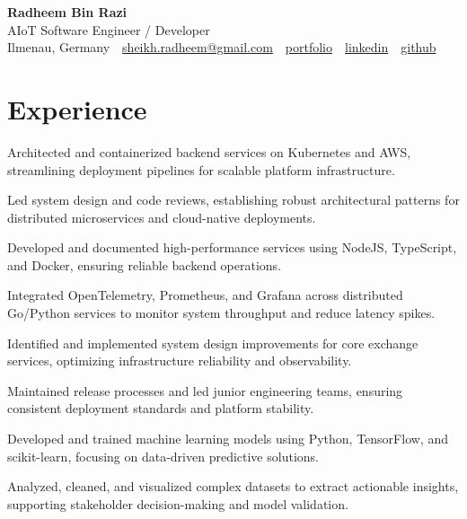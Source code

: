 \documentclass[10pt,a4paper]{resume}
\makeatletter
\newcommand{\Portfolio}{https://radheem.github.io/my-cv}
\newcommand{\PortfolioText}{portfolio}
\newcommand{\GitHub}{https://github.com/radheem}
\newcommand{\LinkedIn}{https://www.linkedin.com/in/radheem-razi}
\newcommand{\Email}{sheikh.radheem@gmail.com}
\makeatother
\begin{document}
\begin{center}
  {\huge\bfseries Radheem Bin Razi}\\[3pt]
  {\large AIoT Software Engineer / Developer}\\[6pt]
  \small
  Ilmenau, Germany \,\textbar\,
  \href{mailto:\Email}{\Email} \,\textbar\,
  \href{\Portfolio}{\PortfolioText} \,\textbar\,
  \href{\LinkedIn}{linkedin} \,\textbar\,
  \href{\GitHub}{github}
\end{center}
\vspace{2pt}

\section{Experience}

\bullets
  \item Architected and containerized backend services on Kubernetes and AWS, streamlining deployment pipelines for scalable platform infrastructure.
  \item Led system design and code reviews, establishing robust architectural patterns for distributed microservices and cloud-native deployments.
  \item Developed and documented high-performance services using NodeJS, TypeScript, and Docker, ensuring reliable backend operations.
\bulletsend
\vspace{1.5pt}
\bullets
  \item Integrated OpenTelemetry, Prometheus, and Grafana across distributed Go/Python services to monitor system throughput and reduce latency spikes.
  \item Identified and implemented system design improvements for core exchange services, optimizing infrastructure reliability and observability.
  \item Maintained release processes and led junior engineering teams, ensuring consistent deployment standards and platform stability.
\bulletsend
\vspace{1.5pt}
\bullets
  \item Developed and trained machine learning models using Python, TensorFlow, and scikit-learn, focusing on data-driven predictive solutions.
  \item Analyzed, cleaned, and visualized complex datasets to extract actionable insights, supporting stakeholder decision-making and model validation.
\bulletsend
\vspace{1.5pt}
\end{document}
